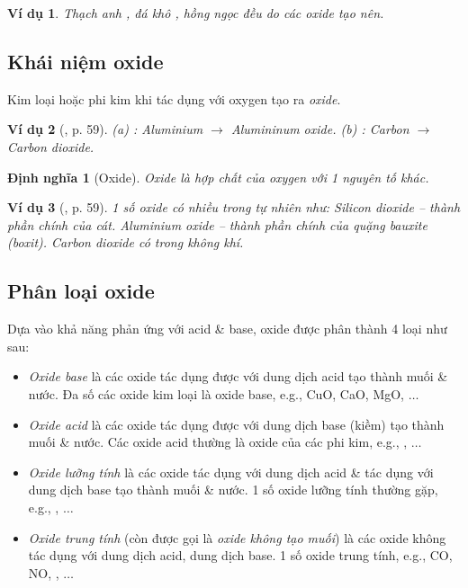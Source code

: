 \documentclass{article}
\newtheorem{dinhnghia}{Định nghĩa}
\newtheorem{vidu}{Ví dụ}
\begin{document}
\begin{vidu}
	Thạch anh \emph{}, đá khô \emph{}, hồng ngọc \emph{} đều do các oxide tạo nên.
\end{vidu}

\subsection{Khái niệm oxide}
Kim loại hoặc phi kim khi tác dụng với oxygen tạo ra \emph{oxide}.

\begin{vidu}[\cite{SGK_KHTN_8_Canh_Dieu}, p. 59]
	(a) \emph{}: Aluminium $\to$ Alumininum oxide. (b) \emph{}: Carbon $\to$ Carbon dioxide.
\end{vidu}

\begin{dinhnghia}[Oxide]
	\emph{Oxide} là hợp chất của oxygen với 1 nguyên tố khác.
\end{dinhnghia}

\begin{vidu}[\cite{SGK_KHTN_8_Canh_Dieu}, p. 59]
	1 số oxide có nhiều trong tự nhiên như: Silicon dioxide \emph{} -- thành phần chính của cát. Aluminium oxide \emph{} -- thành phần chính của quặng bauxite (boxit). Carbon dioxide \emph{} có trong không khí.
\end{vidu}

\subsection{Phân loại oxide}
Dựa vào khả năng phản ứng với acid \& base, oxide được phân thành 4 loại như sau:
\begin{itemize}
	\item \textit{Oxide base} là các oxide tác dụng được với dung dịch acid tạo thành muối \& nước. Đa số các oxide kim loại là oxide base, e.g., CuO, CaO, MgO, $\ldots$
	\item \textit{Oxide acid} là các oxide tác dụng được với dung dịch base (kiềm) tạo thành muối \& nước. Các oxide acid thường là oxide của các phi kim, e.g., , $\ldots$
	\item \textit{Oxide lưỡng tính} là các oxide tác dụng với dung dịch acid \& tác dụng với dung dịch base tạo thành muối \& nước. 1 số oxide lưỡng tính thường gặp, e.g., , $\ldots$
	\item \textit{Oxide trung tính} (còn được gọi là \textit{oxide không tạo muối}) là các oxide không tác dụng với dung dịch acid, dung dịch base. 1 số oxide trung tính, e.g., CO, NO, , $\ldots$
\end{itemize}
\end{document}
